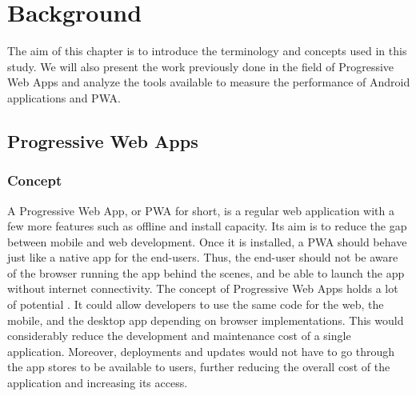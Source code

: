 \documentclass{kththesis}
\begin{document}



\chapter{Background}

The aim of this chapter is to introduce the terminology and concepts used in this study. We will also present the work previously done in the field of Progressive Web Apps and analyze the tools available to measure the performance of Android applications and PWA.

\section{Progressive Web Apps}

\subsection{Concept}

A Progressive Web App, or PWA for short, is a regular web application with a few more features such as offline and install capacity. Its aim is to reduce the gap between mobile and web development. Once it is installed, a PWA should behave just like a native app for the end-users. Thus, the end-user should not be aware of the browser running the app behind the scenes, and be able to launch the app without internet connectivity. \newline
The concept of Progressive Web Apps holds a lot of potential \cite{PWApossibleUnifer}. It could allow developers to use the same code for the web, the mobile, and the desktop app depending on browser implementations. This would considerably reduce the development and maintenance cost of a single application. Moreover, deployments and updates would not have to go through the app stores to be available to users, further reducing the overall cost of the application and increasing its access.
\end{document}
